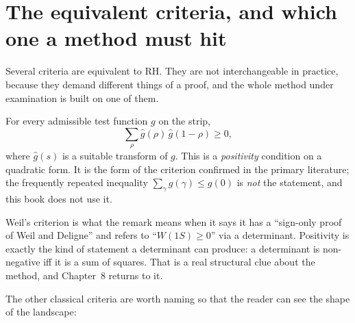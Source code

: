 \section{The equivalent criteria, and which one a method must hit}Several criteria are equivalent to RH. They are not interchangeable in
practice, because they demand different things of a proof, and the whole method
under examination is built on one of them.

\begin{description}[style=nextline,leftmargin=0pt,labelwidth=0pt,labelsep=0pt,font=\sffamily\bfseries\small,
  itemsep=6pt]
\item[Weil's criterion\idx{Weil's criterion}.] For every admissible test function $g$ on the strip,
\begin{equation}
\sum_{\rho} \hat g(\rho)\,\hat g(1-\rho) \ge 0,
\label{eq:weil}
\end{equation}
where $\hat g(s)$ is a suitable transform of $g$. This is a \emph{positivity}
condition on a quadratic form. It is the form of the criterion confirmed in
the primary literature; the frequently repeated inequality $\sum_\gamma g(\gamma)
\le g(0)$ is \emph{not} the statement, and this book does not use it.
\end{description}

Weil's criterion is what the remark means when it says it has a ``sign-only
proof of Weil and Deligne'' and refers to ``$W(1S) \ge 0$'' via a determinant.
Positivity is exactly the kind of statement a determinant can produce: a
determinant is non-negative iff it is a sum of squares. That is a real
structural clue about the method, and Chapter~8 returns to it.

The other classical criteria are worth naming so that the reader can see the
shape of the landscape:

